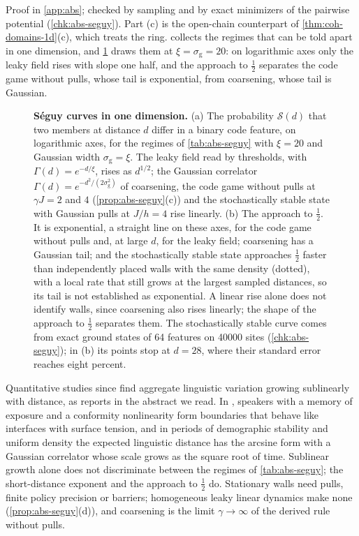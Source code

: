 Proof in \cref{app:abs}; checked by sampling and by exact minimizers of the pairwise potential (\cref{chk:abs-seguy}). Part (c) is the open-chain counterpart of \cref{thm:coh-domains-1d}(c), which treats the ring.  collects the regimes that can be told apart in one dimension, and \cref{fig:abs-seguy} draws them at $\xi=\sigma_{\mathrm g}=20$: on logarithmic axes only the leaky field rises with slope one half, and the approach to $\frac12$ separates the code game without pulls, whose tail is exponential, from coarsening, whose tail is Gaussian.

\begin{figure}[t]
  \centering
  
  \caption{\textbf{S\'eguy curves in one dimension.} (a) The probability $\mathcal S(d)$ that two members at distance $d$ differ in a binary code feature, on logarithmic axes, for the regimes of \cref{tab:abs-seguy} with $\xi=20$ and Gaussian width $\sigma_{\mathrm g}=\xi$. The leaky field read by thresholds, with $\Gamma(d)=e^{-d/\xi}$, rises as $d^{1/2}$; the Gaussian correlator $\Gamma(d)=e^{-d^2/(2\sigma_{\mathrm g}^2)}$ of coarsening, the code game without pulls at $\gamma J=2$ and $4$ (\cref{prop:abs-seguy}(c)) and the stochastically stable state with Gaussian pulls at $J/h=4$ rise linearly. (b) The approach to $\frac12$. It is exponential, a straight line on these axes, for the code game without pulls and, at large $d$, for the leaky field; coarsening has a Gaussian tail; and the stochastically stable state approaches $\frac12$ faster than independently placed walls with the same density (dotted), with a local rate that still grows at the largest sampled distances, so its tail is not established as exponential. A linear rise alone does not identify walls, since coarsening also rises linearly; the shape of the approach to $\frac12$ separates them. The stochastically stable curve comes from exact ground states of 64 features on 40000 sites (\cref{chk:abs-seguy}); in (b) its points stop at $d=28$, where their standard error reaches eight percent.}
  \label{fig:abs-seguy}
\end{figure}

\begin{remark}\label{rem:abs-dialects}
Quantitative studies since \citet{seguy1971relation} find aggregate linguistic variation growing sublinearly with distance, as \citet{nerbonne2010measuring} reports in the abstract we read. In \citet{burridge2017spatial}, speakers with a memory of exposure and a conformity nonlinearity form boundaries that behave like interfaces with surface tension, and in periods of demographic stability and uniform density the expected linguistic distance has the arcsine form with a Gaussian correlator whose scale grows as the square root of time. Sublinear growth alone does not discriminate between the regimes of \cref{tab:abs-seguy}; the short-distance exponent and the approach to $\frac12$ do. Stationary walls need pulls, finite policy precision or barriers; homogeneous leaky linear dynamics make none (\cref{prop:abs-seguy}(d)), and coarsening is the limit $\gamma\to\infty$ of the derived rule without pulls.
\end{remark}

